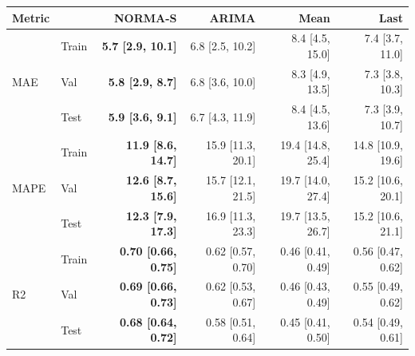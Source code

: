 \begin{table}[ht]
\centering
\footnotesize
\begin{tabular}{llrrrr}
\toprule
Metric & & NORMA-S & ARIMA & Mean & Last \\
\midrule
\multirow{3}{*}{MAE} & Train & \textbf{5.7 [2.9, 10.1]} & 6.8 [2.5, 10.2] & 8.4 [4.5, 15.0] & 7.4 [3.7, 11.0] \\
 & Val & \textbf{5.8 [2.9, 8.7]} & 6.8 [3.6, 10.0] & 8.3 [4.9, 13.5] & 7.3 [3.8, 10.3] \\
 & Test & \textbf{5.9 [3.6, 9.1]} & 6.7 [4.3, 11.9] & 8.4 [4.5, 13.6] & 7.3 [3.9, 10.7] \\
\midrule
\multirow{3}{*}{MAPE} & Train & \textbf{11.9 [8.6, 14.7]} & 15.9 [11.3, 20.1] & 19.4 [14.8, 25.4] & 14.8 [10.9, 19.6] \\
 & Val & \textbf{12.6 [8.7, 15.6]} & 15.7 [12.1, 21.5] & 19.7 [14.0, 27.4] & 15.2 [10.6, 20.1] \\
 & Test & \textbf{12.3 [7.9, 17.3]} & 16.9 [11.3, 23.3] & 19.7 [13.5, 26.7] & 15.2 [10.6, 21.1] \\
\midrule
\multirow{3}{*}{R2} & Train & \textbf{0.70 [0.66, 0.75]} & 0.62 [0.57, 0.70] & 0.46 [0.41, 0.49] & 0.56 [0.47, 0.62] \\
 & Val & \textbf{0.69 [0.66, 0.73]} & 0.62 [0.53, 0.67] & 0.46 [0.43, 0.49] & 0.55 [0.49, 0.62] \\
 & Test & \textbf{0.68 [0.64, 0.72]} & 0.58 [0.51, 0.64] & 0.45 [0.41, 0.50] & 0.54 [0.49, 0.61] \\
\bottomrule
\end{tabular}
\label{tab:05_prediction_performance}
\end{table}